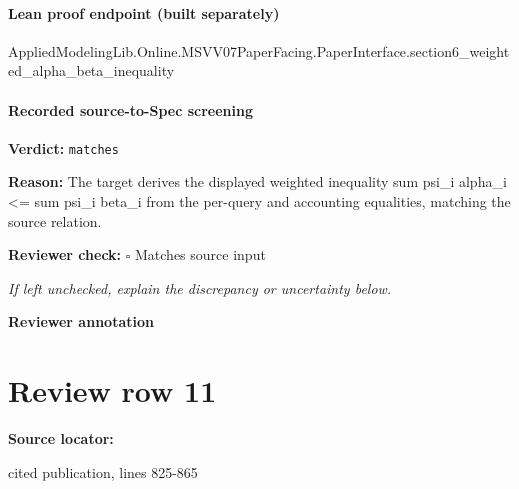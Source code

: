 \documentclass[10pt]{article}
\newcommand{\reviewerbox}{%
  \par\noindent\fbox{\parbox{0.96\linewidth}{\rule{0pt}{0.38in}}}\par
}
\newcommand{\reviewmatch}[1]{%
  \par\noindent\textbf{Reviewer check:} $\square$\; #1\par
  \noindent\emph{If left unchecked, explain the discrepancy or uncertainty below.}\par
}
\begin{document}
\paragraph{Lean proof endpoint (built separately)}\begin{ReviewVerbatim}
AppliedModelingLib.Online.MSVV07PaperFacing.PaperInterface.section6_weighted_alpha_beta_inequality
\end{ReviewVerbatim}

\paragraph{Recorded source-to-Spec screening}
\textbf{Verdict:} \texttt{matches}
\\
{\raggedright
\textbf{Reason:} The target derives the displayed weighted inequality sum psi\_\allowbreak{}i alpha\_\allowbreak{}i <= sum psi\_\allowbreak{}i beta\_\allowbreak{}i from the per-\allowbreak{}query and accounting equalities, matching the source relation.\allowbreak{}
\par}
\reviewmatch{Matches source input}
\noindent\textbf{Reviewer annotation}\par
\reviewerbox
\clearpage
\hypertarget{source-claim-9174699fa51690f5}{}
\section*{Review row 11}
\textbf{Source locator:} {\footnotesize\raggedright cited publication, lines 825-\allowbreak{}865\par}
\end{document}
